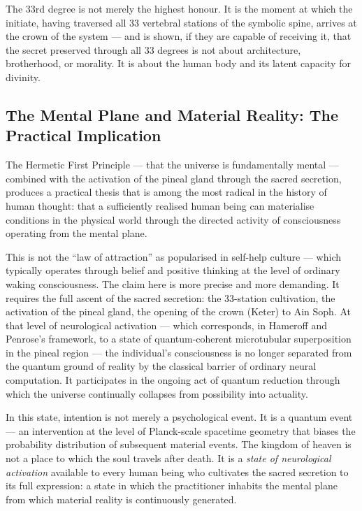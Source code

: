 \documentclass[12pt, a4paper]{article}
\begin{document}
The 33rd degree is not merely the highest honour. It is the moment at which the
initiate, having traversed all 33 vertebral stations of the symbolic spine,
arrives at the crown of the system — and is shown, if they are capable of
receiving it, that the secret preserved through all 33 degrees is not about
architecture, brotherhood, or morality. It is about the human body and its
latent capacity for divinity.

\subsection{The Mental Plane and Material Reality: The Practical Implication}

The Hermetic First Principle — that the universe is fundamentally mental —
combined with the activation of the pineal gland through the sacred secretion,
produces a practical thesis that is among the most radical in the history of
human thought: that a sufficiently realised human being can materialise
conditions in the physical world through the directed activity of consciousness
operating from the mental plane.

This is not the ``law of attraction'' as popularised in self-help culture —
which typically operates through belief and positive thinking at the level of
ordinary waking consciousness. The claim here is more precise and more
demanding. It requires the full ascent of the sacred secretion: the 33-station
cultivation, the activation of the pineal gland, the opening of the crown
(Keter) to Ain Soph. At that level of neurological activation — which
corresponds, in Hameroff and Penrose's framework, to a state of
quantum-coherent microtubular superposition in the pineal region — the
individual's consciousness is no longer separated from the quantum ground of
reality by the classical barrier of ordinary neural computation. It participates
in the ongoing act of quantum reduction through which the universe continually
collapses from possibility into actuality.

In this state, intention is not merely a psychological event. It is a quantum
event — an intervention at the level of Planck-scale spacetime geometry that
biases the probability distribution of subsequent material events. The kingdom
of heaven is not a place to which the soul travels after death. It is a
\emph{state of neurological activation} available to every human being who
cultivates the sacred secretion to its full expression: a state in which the
practitioner inhabits the mental plane from which material reality is
continuously generated.
\end{document}
